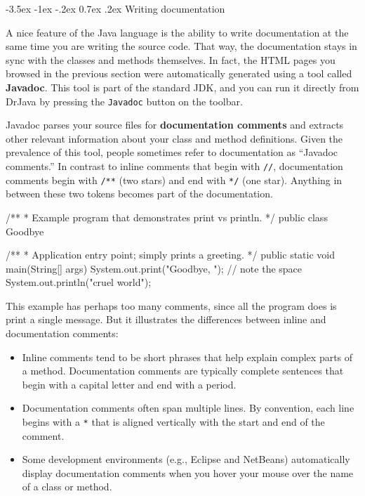 \documentclass[12pt]{book}
\makeatletter
\theoremstyle{exercise}
\newcommand{\java}[1]{\verb"#1"}
\renewcommand{\section}{\@startsection {section}{1}{\z@}%
    {-3.5ex \@plus -1ex \@minus -.2ex}%
    {0.7ex \@plus.2ex}%
    {\normalfont\Large\bfseries}}
\newcommand{\java}[1]{\lstinline{#1}} %
\makeatother
\begin{document}
\section{Writing documentation}


A nice feature of the Java language is the ability to write documentation at the same time you are writing the source code.
That way, the documentation stays in sync with the classes and methods themselves.
In fact, the HTML pages you browsed in the previous section were automatically generated using a tool called {\bf Javadoc}.
This tool is part of the standard JDK, and you can run it directly from DrJava by pressing the {\tt Javadoc} button on the toolbar.


Javadoc parses your source files for {\bf documentation comments} and extracts other relevant information about your class and method definitions.
Given the prevalence of this tool, people sometimes refer to documentation as ``Javadoc comments.''
In contrast to inline comments that begin with \java{//}, documentation comments begin with \java{/**} (two stars) and end with \java{*/} (one star).
Anything in between these two tokens becomes part of the documentation.

\begin{code}
/**
 * Example program that demonstrates print vs println.
 */
public class Goodbye {

    /**
     * Application entry point; simply prints a greeting.
     */
    public static void main(String[] args) {
        System.out.print("Goodbye, ");  // note the space
        System.out.println("cruel world");
    }

}
\end{code}

This example has perhaps too many comments, since all the program does is print a single message.
But it illustrates the differences between inline and documentation comments:

\begin{itemize}
\item Inline comments tend to be short phrases that help explain complex parts of a method.
Documentation comments are typically complete sentences that begin with a capital letter and end with a period.

\item Documentation comments often span multiple lines.
By convention, each line begins with a \java{*} that is aligned vertically with the start and end of the comment.

\item Some development environments (e.g., Eclipse and NetBeans) automatically display documentation comments when you hover your mouse over the name of a class or method.

\end{itemize}
\end{document}
